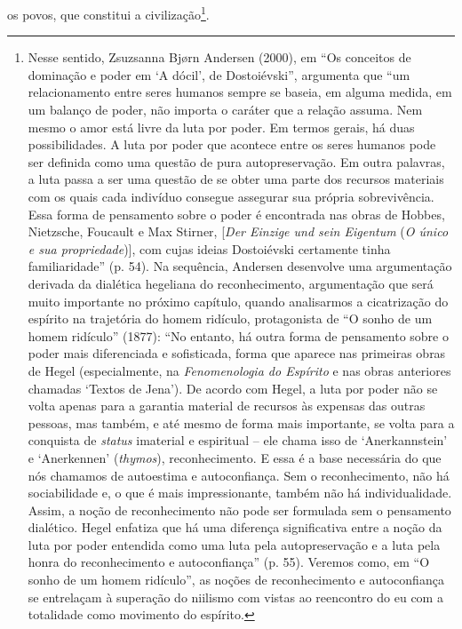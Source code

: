 os povos, que constitui a civilização\footnote{Nesse sentido, Zsuzsanna
  Bjørn Andersen (2000), em ``Os conceitos de dominação e poder em `A
  dócil', de Dostoiévski'', argumenta que ``um relacionamento entre
  seres humanos sempre se baseia, em alguma medida, em um balanço de
  poder, não importa o caráter que a relação assuma. Nem mesmo o amor
  está livre da luta por poder. Em termos gerais, há duas
  possibilidades. A luta por poder que acontece entre os seres humanos
  pode ser definida como uma questão de pura autopreservação. Em outra
  palavras, a luta passa a ser uma questão de se obter uma parte dos
  recursos materiais com os quais cada indivíduo consegue assegurar sua
  própria sobrevivência. Essa forma de pensamento sobre o poder é
  encontrada nas obras de Hobbes, Nietzsche, Foucault e Max Stirner,
  {[}\emph{Der Einzige und sein Eigentum} (\emph{O único e sua
  propriedade}){]}, com cujas ideias Dostoiévski certamente tinha
  familiaridade'' (p. 54). Na sequência, Andersen desenvolve uma
  argumentação derivada da dialética hegeliana do reconhecimento,
  argumentação que será muito importante no próximo capítulo, quando
  analisarmos a cicatrização do espírito na trajetória do homem
  ridículo, protagonista de ``O sonho de um homem ridículo'' (1877):
  ``No entanto, há outra forma de pensamento sobre o poder mais
  diferenciada e sofisticada, forma que aparece nas primeiras obras de
  Hegel (especialmente, na \emph{Fenomenologia do Espírito} e nas obras
  anteriores chamadas `Textos de Jena'). De acordo com Hegel, a luta por
  poder não se volta apenas para a garantia material de recursos às
  expensas das outras pessoas, mas também, e até mesmo de forma mais
  importante, se volta para a conquista de \emph{status} imaterial e
  espiritual -- ele chama isso de `Anerkannstein' e `Anerkennen'
  (\emph{thymos}), reconhecimento. E essa é a base necessária do que nós
  chamamos de autoestima e autoconfiança. Sem o reconhecimento, não há
  sociabilidade e, o que é mais impressionante, também não há
  individualidade. Assim, a noção de reconhecimento não pode ser
  formulada sem o pensamento dialético. Hegel enfatiza que há uma
  diferença significativa entre a noção da luta por poder entendida como
  uma luta pela autopreservação e a luta pela honra do reconhecimento e
  autoconfiança'' (p. 55). Veremos como, em ``O sonho de um homem
  ridículo'', as noções de reconhecimento e autoconfiança se entrelaçam
  à superação do niilismo com vistas ao reencontro do eu com a
  totalidade como movimento do espírito.}.

